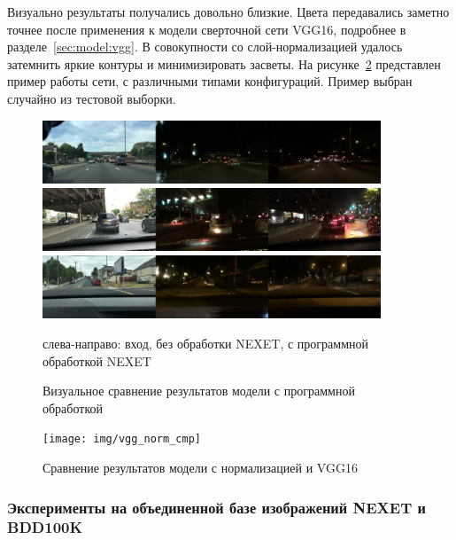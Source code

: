 \documentclass[11pt,a4paper]{extarticle}
\begin{document}
{			Визуально результаты получались довольно близкие.
			Цвета передавались заметно точнее после применения к модели сверточной сети VGG16, подробнее в разделе~\ref{sec:model:vgg}.
			В совокупности со слой-нормализацией удалось затемнить яркие контуры и минимизировать засветы.
			На рисунке~\ref{pic:vgg_no_vgg} представлен пример работы сети, с различными типами конфигураций.
			Пример выбран случайно из тестовой выборки.  

			\begin{figure}[ht]
				\centering
				\includegraphics[width=0.9\textwidth]{img/example_no_err_2}
				\includegraphics[width=0.9\textwidth]{img/example_no_err_1}
				\includegraphics[width=0.9\textwidth]{img/example_no_err_3}
				\caption{Визуальное сравнение результатов модели с программной обработкой}{
					\small{
						слева-направо: вход, без обработки NEXET, с программной обработкой NEXET
					}
				}
				\label{pic:example_no_err}
			\end{figure}

			\begin{figure}[ht]
				\centering
				\texttt{[image: img/vgg\_norm\_cmp]}
				\caption{Сравнение результатов модели с нормализацией и VGG16}
				
				\label{pic:vgg_no_vgg}
			\end{figure}
			
		\subsubsection{Эксперименты на объединенной базе изображений NEXET и BDD100K}\label{sec:tests:nexet_bdd}
			
}
\end{document}
